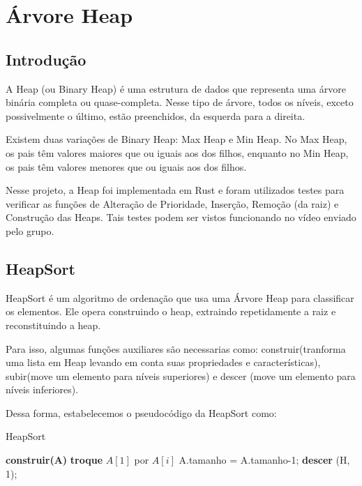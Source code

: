 \chapter{Árvore Heap}
\label{ch:heap} %

% 
\section*{Introdução}
A Heap (ou Binary Heap) é uma estrutura de dados que representa uma árvore binária completa ou quase-completa. Nesse tipo de árvore, todos os níveis, exceto possivelmente o último, estão preenchidos, da esquerda para a direita.

Existem duas variações de Binary Heap: Max Heap e Min Heap. No Max Heap, os pais têm valores maiores que ou iguais aos dos filhos, enquanto no Min Heap, os pais têm valores menores que ou iguais aos dos filhos.

Nesse projeto, a Heap foi implementada em Rust e foram utilizados testes para verificar as funções de Alteração de Prioridade, Inserção, Remoção (da raiz) e Construção das Heaps. Tais testes podem ser vistos funcionando no vídeo enviado pelo grupo.

\section*{HeapSort}

HeapSort é um algoritmo de ordenação que usa uma Árvore Heap para classificar os elementos. Ele opera construindo o heap, extraindo repetidamente a raiz e reconstituindo a heap.

Para isso, algumas funções auxiliares são necessarias como: construir(tranforma uma lista em Heap levando em conta suas propriedades e características), subir(move um elemento para níveis superiores) e descer (move um elemento para níveis inferiores).

Dessa forma, estabelecemos o pseudocódigo da HeapSort como:

\begin{algorithm}
	\caption{HeapSort}
	\label{algo:heap_sort}
	\begin{algorithmic}[1]
		\Statex
        \State \textbf{construir(A)}
        \State \textbf{troque} $A[1]$ por $A[i]$
        \State A.tamanho = A.tamanho-1;
		\State \textbf{descer} (H, 1);
		\EndFor
		\EndFunction
	\end{algorithmic}
\end{algorithm}
\FloatBarrier

% 
%
% 
